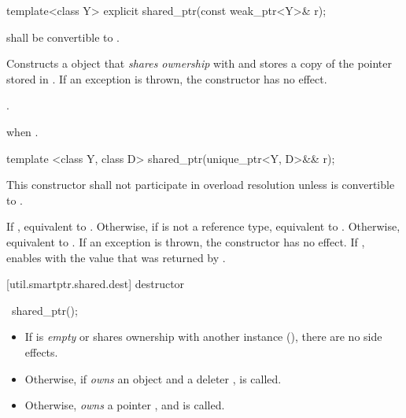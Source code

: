 %
%
\begin{itemdecl}
template<class Y> explicit shared_ptr(const weak_ptr<Y>& r);
\end{itemdecl}

\begin{itemdescr}
\pnum\requires {} shall be convertible to .

\pnum\effects  Constructs a  object that \textit{shares ownership} with
 and stores a copy of the pointer stored in .
If an exception is thrown, the constructor has no effect.

\pnum\postcondition  {}.

\pnum\throws  {} when .
\end{itemdescr}

%
%
\begin{itemdecl}
template <class Y, class D> shared_ptr(unique_ptr<Y, D>&& r);
\end{itemdecl}

\begin{itemdescr}
\pnum\remark This constructor shall not participate in overload resolution
unless  is convertible to .

\pnum
\effects If , equivalent to .
Otherwise, if  is not a reference type,
equivalent to .
Otherwise, equivalent to .
If an exception is thrown, the constructor has no effect.
If ,
enables  with the value that was returned
by .
\end{itemdescr}

[util.smartptr.shared.dest]{ destructor}

%
\begin{itemdecl}
~shared_ptr();
\end{itemdecl}

\begin{itemdescr}
\pnum\effects
\begin{itemize}
\item If  is \textit{empty} or shares ownership with another
 instance (), there are no side effects.

\item
Otherwise, if  \textit{owns} an object
 and a deleter ,  is called.

\item Otherwise,  \textit{owns} a pointer ,
and  is called.
\end{itemize}
\end{itemdescr}

